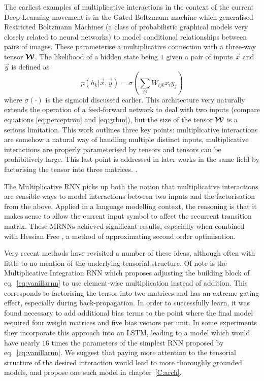 The earliest examples of multiplicative interactions in the context of the current Deep Learning
movement is in the Gated Boltzmann machine \autocite{Memisevic2007} which generalised Restricted
Boltzmann Machines \autocite{Smolensky1986} (a class of probabilistic graphical models very closely
related to neural networks) to model conditional relationships between pairs of images. These 
parameterise a multiplicative connection with a three-way tensor \(\bm{\mathcal{W}}\).
The likelihood of a hidden state
being \(1\) given a pair of inputs \(\vec{x}\) and \(\vec{y}\) is defined as
\begin{equation}\label{eq:grbm}
	p(h_k | \vec{x},\vec{y}) = \sigma\left(\sum_{ij} W_{ijk}x_iy_j \right)
\end{equation} where \(\sigma(\cdot)\) is the sigmoid discussed earlier. \autocite{Memisevic2007}
This architecture very naturally extends the operation of a feed-forward network to deal with
two inputs (compare equations \eqref{eq:perceptron} and \eqref{eq:grbm}), but the size of the
tensor \(\bm{\mathcal{W}}\) is a serious limitation. This work outlines three key points: 
multiplicative interactions are somehow a natural way of handling multiple distinct inputs,
multiplicative interactions are properly parameterised by tensors
and tensors can be prohibitively large.
This last point is addressed in later works in the same field by factorising the tensor into three
matrices. \autocite{Taylor, Memisevic2010}.

The Multiplicative RNN \autocite{Martens2011a, Sutskever2013} picks up both the notion that
multiplicative interactions are sensible ways to model interactions between two inputs and the
factorisation from the above. Applied in a language modelling context, the reasoning is that it
makes sense to allow the current input symbol to affect the recurrent transition matrix. These MRNNs
achieved significant results, especially when combined with Hessian Free \autocite{Martens2011},
a method of approximating second order optimisation.

Very recent methods have revisited a number of these ideas, although often with little to no mention
of the underlying tensorial structure. Of note is the Multiplicative Integration RNN which proposes
adjusting the building block of eq.~\eqref{eq:vanillarnn} to use element-wise multiplication instead
of addition. \autocite{Wu2016}
 This corresponds to factorising the tensor into two matrices and has an extreme gating
effect, especially during back-propagation.
In order to successfully learn, it was found necessary to add additional bias terms to the
point where the final model required four weight matrices and five bias vectors per unit. In some
experiments they incorporate this approach into an LSTM, leading to a model which would have nearly
\(16\) times the parameters of the simplest RNN proposed by eq.~\eqref{eq:vanillarnn}. We suggest
that paying more attention to the tensorial structure of the desired interaction would lead to more
thoroughly grounded models, and propose one such model in chapter~\ref{C:arch}.


